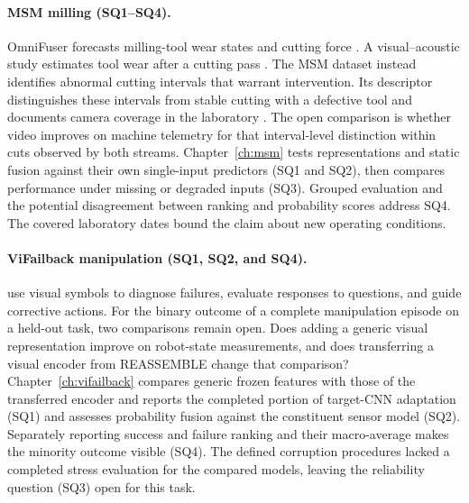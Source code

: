 \paragraph{MSM milling (SQ1--SQ4).}
OmniFuser forecasts milling-tool wear states and cutting force \citep[PDF p.~11, Tables~IV--V]{P021}. A visual--acoustic study estimates tool wear after a cutting pass \citep[PDF p.~24, Table~1]{P045}. The MSM dataset instead identifies abnormal cutting intervals that warrant intervention. Its descriptor distinguishes these intervals from stable cutting with a defective tool and documents camera coverage in the laboratory \citep{Kim2026MSM}. The open comparison is whether video improves on machine telemetry for that interval-level distinction within cuts observed by both streams. Chapter~\ref{ch:msm} tests representations and static fusion against their own single-input predictors (SQ1 and SQ2), then compares performance under missing or degraded inputs (SQ3). Grouped evaluation and the potential disagreement between ranking and probability scores address SQ4. The covered laboratory dates bound the claim about new operating conditions.

\paragraph{ViFailback manipulation (SQ1, SQ2, and SQ4).}
\citet[PDF pp.~7--8, Tables~2--4]{Zeng2026ViFailback} use visual symbols to diagnose failures, evaluate responses to questions, and guide corrective actions. For the binary outcome of a complete manipulation episode on a held-out task, two comparisons remain open. Does adding a generic visual representation improve on robot-state measurements, and does transferring a visual encoder from REASSEMBLE change that comparison? Chapter~\ref{ch:vifailback} compares generic frozen features with those of the transferred encoder and reports the completed portion of target-CNN adaptation (SQ1) and assesses probability fusion against the constituent sensor model (SQ2). Separately reporting success and failure ranking and their macro-average makes the minority outcome visible (SQ4). The defined corruption procedures lacked a completed stress evaluation for the compared models, leaving the reliability question (SQ3) open for this task.


